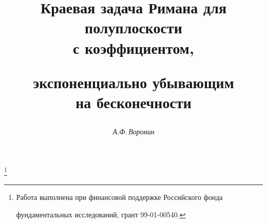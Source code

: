 











\newcommand{\arctg}{\operatorname{arctg}}


\newcommand{\tg}{\operatorname{tg}}


\newcommand{\tts}[1]{}







\setcounter{page}{20}















\author{\it А.Ф.\,Воронин}




\title{Краевая задача Римана для полуплоскости\\ с коэффициентом,


экспоненциально убывающим\\ на бесконечности}


\thanks{Работа выполнена при финансовой поддержке Российского фонда


фундаментальных исследований, грант 99-01-00540.}





\date{}




\pagestyle{plain} %





